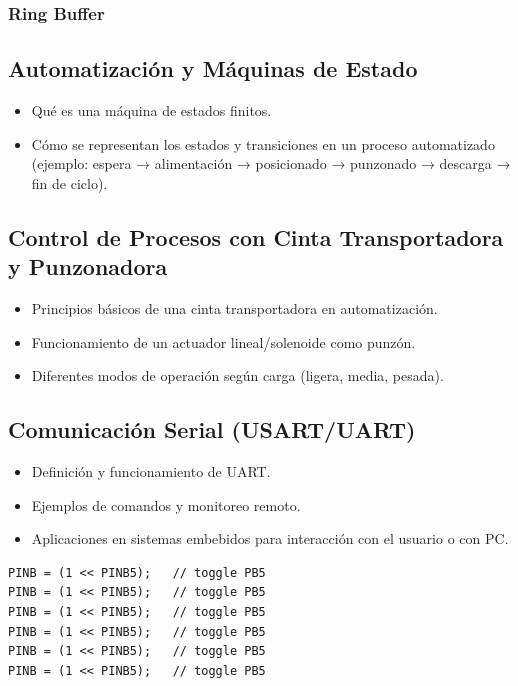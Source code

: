     \subsubsection{Ring Buffer}
    



\subsection{Automatización y Máquinas de Estado}
\begin{itemize}
    \item Qué es una máquina de estados finitos.
    \item Cómo se representan los estados y transiciones en un proceso automatizado (ejemplo: espera → alimentación → posicionado → punzonado → descarga → fin de ciclo).
\end{itemize}


\subsection{Control de Procesos con Cinta Transportadora y Punzonadora}
\begin{itemize}
    \item Principios básicos de una cinta transportadora en automatización.
    \item Funcionamiento de un actuador lineal/solenoide como punzón.
    \item Diferentes modos de operación según carga (ligera, media, pesada).
\end{itemize}


\subsection{Comunicación Serial (USART/UART)}
\begin{itemize}
    \item Definición y funcionamiento de UART.
    \item Ejemplos de comandos y monitoreo remoto.
    \item Aplicaciones en sistemas embebidos para interacción con el usuario o con PC.
\end{itemize}

\begin{verbatim}
PINB = (1 << PINB5);   // toggle PB5
PINB = (1 << PINB5);   // toggle PB5
PINB = (1 << PINB5);   // toggle PB5
PINB = (1 << PINB5);   // toggle PB5
PINB = (1 << PINB5);   // toggle PB5
PINB = (1 << PINB5);   // toggle PB5
\end{verbatim}


